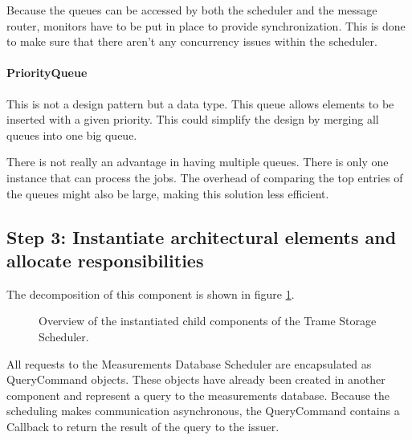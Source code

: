 \npar Because the queues can be accessed by both the scheduler and the message
router, monitors have to be put in place to provide synchronization. This is
done to make sure that there aren't any concurrency issues within the scheduler. 

\paragraph{PriorityQueue}

\npar This is not a design pattern but a data type. This queue allows elements
to be inserted with a given priority. This could simplify the design by merging
all queues into one big queue.

\npar There is not really an advantage in having multiple queues. There is only
one instance that can process the jobs. The overhead of comparing the top
entries of the queues might also be large, making this solution less efficient. 

\subsection{Step 3: Instantiate architectural elements and allocate responsibilities}
\label{add:it3/elements}


\npar The decomposition of this component is shown in figure
\ref{fig:it3/elements}. 

\begin{figure}[H]
	\begin{centering}
		\caption{Overview of the instantiated child components of the Trame Storage
		Scheduler.}
		\label{fig:it3/elements}
	\end{centering}
\end{figure}

\npar All requests to the Measurements Database Scheduler are encapsulated as
QueryCommand objects. These objects have already been created in another
component and represent a query to the measurements database. Because the
scheduling makes communication asynchronous, the QueryCommand contains a
Callback to return the result of the query to the issuer.

